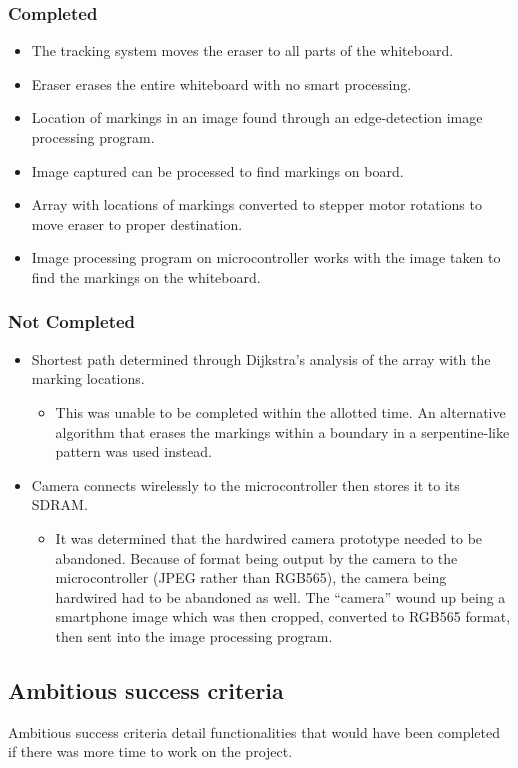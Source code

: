 \subsubsection{Completed}
\begin{itemize}
\item The tracking system moves the eraser to all parts of the whiteboard.
\item Eraser erases the entire whiteboard with no smart processing.
\item Location of markings in an image found through an edge-detection image processing program.
\item Image captured can be processed to find markings on board.
\item Array with locations of markings converted to stepper motor rotations to move eraser to proper destination.
\item Image processing program on microcontroller works with the image taken to find the markings on the whiteboard.\\
\end{itemize}
\subsubsection{Not Completed}
\begin{itemize}
\item Shortest path determined through Dijkstra's analysis of the array with the marking locations.
	\begin{itemize}
	\item This was unable to be completed within the allotted time. An alternative algorithm that erases the markings within a boundary in a serpentine-like pattern was used instead.
	\end{itemize}
\item Camera connects wirelessly to the microcontroller then stores it to its SDRAM.
	\begin{itemize}
	\item It was determined that the hardwired camera prototype needed to be abandoned. Because of format being output by the camera to the microcontroller (JPEG rather than RGB565), the camera being hardwired had to be abandoned as well. The ``camera'' wound up being a smartphone image which was then cropped, converted to RGB565 format, then sent into the image processing program.
	\end{itemize}
\end{itemize}

\subsection{Ambitious success criteria}
Ambitious success criteria detail functionalities that would have been completed if there was more time to work on the project.\\
